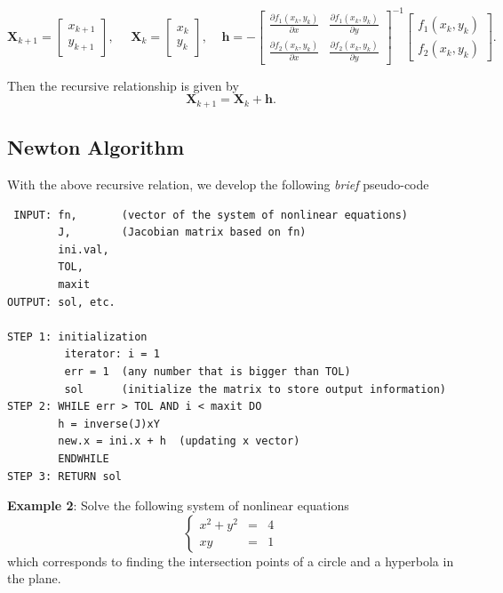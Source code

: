 \documentclass[
]{book}
\begin{document}
\[
\mathbf{X}_{k+1} =\left[
\begin{array}{cc}
x_{k+1} \\
y_{k+1}
\end{array}
\right],
~~~~~~
\mathbf{X}_{k} =
\left[
\begin{array}{cc}
x_k \\
y_k
\end{array}
\right],
~~~~~
\mathbf{h} = -
\left[
\begin{array}{cc}
\frac{\partial f_1(x_k, y_k)}{\partial x} & \frac{\partial f_1(x_k,y_k)}{\partial y}\\
\frac{\partial f_2(x_k, y_k)}{\partial x} & \frac{\partial f_2(x_k,y_k)}{\partial y}
\end{array}
\right]^{-1}
\left[
\begin{array}{cc}
f_1(x_k,y_k)\\
f_2(x_k,y_k)
\end{array}
\right].
\]

Then the recursive relationship is given by \[
\mathbf{X}_{k+1} = \mathbf{X}_{k} + \mathbf{h}. 
\]

\hfill\break

\hypertarget{newton-algorithm}{%
\subsection{Newton Algorithm}\label{newton-algorithm}}

With the above recursive relation, we develop the following \emph{brief}
pseudo-code

\begin{verbatim}
 INPUT: fn,       (vector of the system of nonlinear equations)
        J,        (Jacobian matrix based on fn)
        ini.val,   
        TOL, 
        maxit 
OUTPUT: sol, etc.        

STEP 1: initialization 
         iterator: i = 1
         err = 1  (any number that is bigger than TOL)
         sol      (initialize the matrix to store output information) 
STEP 2: WHILE err > TOL AND i < maxit DO
        h = inverse(J)xY
        new.x = ini.x + h  (updating x vector)
        ENDWHILE
STEP 3: RETURN sol
\end{verbatim}

\textbf{Example 2}: Solve the following system of nonlinear equations \[
\left\{
\begin{array}{lcl}
x^2 + y^2 & = & 4 \\
xy & = & 1
\end{array}
\right.
\] which corresponds to finding the intersection points of a circle and
a hyperbola in the plane.
\end{document}
